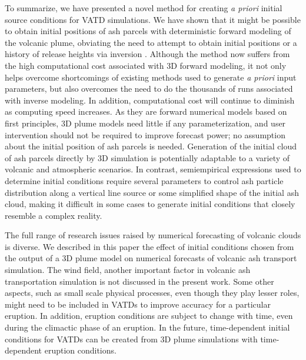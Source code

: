 \documentclass[draft,linenumbers]{agujournal2019}
\begin{document}
To summarize, we have presented a novel method for creating \textit{a priori} initial source conditions for VATD simulations. We have shown that it might be possible to obtain initial positions of ash parcels with deterministic forward modeling of the volcanic plume, obviating the need to attempt to obtain initial positions or a history of release heights via inversion \citep{stohl2011determination}. Although the method now suffers from the high computational cost associated with 3D forward modeling, it not only helps overcome shortcomings of existing methods used to generate \textit{a priori} input parameters, but also overcomes the need to do the thousands of runs associated with inverse modeling. In addition, computational cost will continue to diminish as computing speed increases. As they are forward numerical models based on first principles, 3D plume models need little if any parameterization, and user intervention should not be required to improve forecast power; no assumption about the initial position of ash parcels is needed. Generation of the initial cloud of ash parcels directly by 3D simulation is potentially adaptable to a variety of volcanic and atmospheric scenarios. In contrast, semiempirical expressions used to determine initial conditions require several parameters to control ash particle distribution along a vertical line source or some simplified shape of the initial ash cloud, making it difficult in some cases to generate initial conditions that closely resemble a complex reality.

The full range of research issues raised by numerical forecasting of volcanic clouds is diverse. We described in this paper the effect of initial conditions chosen from the output of a 3D plume model on numerical forecasts of volcanic ash transport simulation. The wind field, another important factor in volcanic ash transportation simulation is not discussed in the present work. Some other aspects, such as small scale physical processes, even though they play lesser roles, might need to be included in VATDs to improve accuracy for a particular eruption. In addition, eruption conditions are subject to change with time, even during the climactic phase of an eruption. In the future, time-dependent initial conditions for VATDs can be created from 3D plume simulations with time-dependent eruption conditions.



\end{document}

